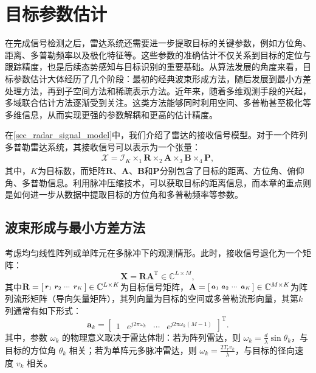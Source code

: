 \chapter{目标参数估计}

在完成信号检测之后，雷达系统还需要进一步提取目标的关键参数，例如方位角、距离、多普勒频率以及极化特征等。这些参数的准确估计不仅关系到目标的定位与跟踪精度，也是后续态势感知与目标识别的重要基础。从算法发展的角度来看，目标参数估计大体经历了几个阶段：最初的经典波束形成方法，随后发展到最小方差处理方法，再到子空间方法和稀疏表示方法。近年来，随着多维观测手段的兴起，多域联合估计方法逐渐受到关注。这类方法能够同时利用空间、多普勒甚至极化等多维信息，从而实现更强的参数解耦和更高的估计精度。

在\cref{sec_radar_signal_model}中，我们介绍了雷达的接收信号模型。对于一个阵列多普勒雷达系统，其接收信号可以表示为一个张量：
\[
    \begin{split}
        \mathcal{X} = \mathcal{I}_K \times_1 \mathbf{R} \times_2 \mathbf{A} \times_3 \mathbf{B} \times_4 \mathbf{P},
    \end{split}
\]
其中，\( K \)为目标数，而矩阵\( \mathbf{R} \)、\( \mathbf{A} \)、\( \mathbf{B} \)和\( \mathbf{P} \)分别包含了目标的距离、方位角、俯仰角、多普勒信息。利用脉冲压缩技术，可以获取目标的距离信息，而本章的重点则是如何进一步从数据中提取目标的方位角和多普勒频率等参数。

\section{波束形成与最小方差方法}
考虑均匀线性阵列或单阵元在多脉冲下的观测情形。此时，接收信号退化为一个矩阵：
\[
    \mathbf{X} = \mathbf{R} \mathbf{A}^{\mathrm{T}} \in \mathbb{C}^{L \times M},
\]
其中\( \mathbf{R} = \begin{bsmallmatrix} \boldsymbol{r}_1 & \boldsymbol{r}_2 & \cdots & \boldsymbol{r}_K \end{bsmallmatrix} \in \mathbb{C}^{L \times K} \)为目标信号矩阵，\( \mathbf{A} = \begin{bsmallmatrix} \boldsymbol{a}_1 & \boldsymbol{a}_2 & \cdots & \boldsymbol{a}_K \end{bsmallmatrix} \in \mathbb{C}^{M \times K} \)为阵列流形矩阵（导向矢量矩阵），其列向量为目标的空间或多普勒流形向量，其第\( k \)列通常有如下形式：
\[
    \bm{a}_k = \begin{bmatrix}
        1 & e^{j 2 \pi \omega_k} & \cdots & e^{j 2 \pi \omega_k (M-1)}
    \end{bmatrix}^{\mathrm{T}}.
\]
其中，参数 $\omega_k$ 的物理意义取决于雷达体制：若为阵列雷达，则 $\omega_k = \tfrac{d}{\lambda}\sin \theta_k$，与目标的方位角 $\theta_k$ 相关；若为单阵元多脉冲雷达，则 $\omega_k = \tfrac{2 T_r v_k}{\lambda}$，与目标的径向速度 $v_k$ 相关。


